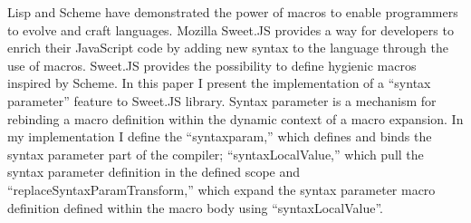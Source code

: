 Lisp and Scheme have demonstrated the power of macros to enable programmers to evolve and craft languages. Mozilla Sweet.JS provides a way for developers to enrich their JavaScript code by adding new syntax to the language through the use of macros. Sweet.JS provides the possibility to define hygienic macros inspired by Scheme. In this paper I present the implementation of a ``syntax parameter'' feature to Sweet.JS library. Syntax parameter is a mechanism for rebinding a macro definition within the dynamic context of a macro expansion. In my implementation I define the ``syntaxparam,'' which defines and binds the syntax parameter part of the compiler; ``syntaxLocalValue,'' which pull the syntax parameter definition in the defined scope and ``replaceSyntaxParamTransform,'' which expand the syntax parameter macro definition defined within the macro body using ``syntaxLocalValue''.